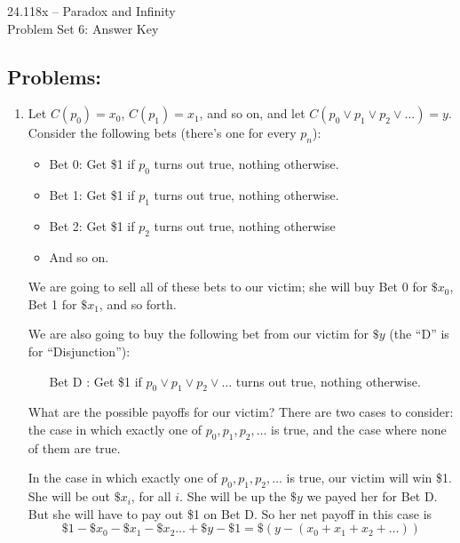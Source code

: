 \documentclass[12pt,a4paper]{article}
\begin{document}
\begin{center} {\large 24.118x -- Paradox and Infinity \\ \vspace{1mm}}
 {\large Problem Set 6: Answer Key \\ \vspace{1mm}}
 
\end{center}
\vspace{3mm}


\subsection*{Problems:}


\begin{enumerate}

\item Let $C(p_0)=x_0$, $C(p_1)=x_1$, and so on, and let $C(p_0\vee p_1\vee p_2\vee\ldots)=y$. Consider the following bets (there's one for every $p_n$):
\begin{itemize}
\item Bet 0: Get \$1 if $p_0$ turns out true, nothing otherwise.
\item Bet 1: Get \$1 if $p_1$ turns out true, nothing otherwise.
\item Bet 2: Get \$1 if $p_2$ turns out true, nothing otherwise
\item And so on.
\end{itemize}


We are going to sell all of these bets to our victim; she will buy Bet 0 for $\$x_0$, Bet 1 for $\$x_1$, and so forth.

We are also going to buy the following bet from our victim for $\$y$ (the ``D'' is for ``Disjunction''):
\begin{itemize}
\item[Bet D]: Get \$1 if $p_0\vee p_1\vee p_2\vee\ldots$ turns out true, nothing otherwise.
\end{itemize}

What are the possible payoffs for our victim? There are two cases to consider: the case in which exactly one of $p_0,p_1,p_2,\ldots$ is true, and the case where none of them are true.

In the case in which exactly one of $p_0,p_1,p_2,\ldots$ is true, our victim will win \$1. She will be out $\$x_i$, for all $i$. She will be up the $\$y$ we payed her for Bet D. But she will have to pay out \$1 on Bet D. So her net payoff in this case is $$\$1-\$x_0 - \$x_1 - \$x_2\ldots +\$y -\$1 = \$(y-(x_0+x_1+x_2+\ldots))$$


\end{enumerate}
\end{document}
